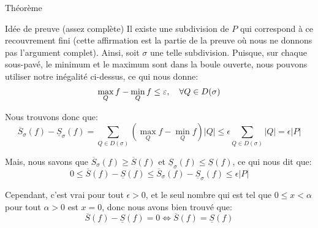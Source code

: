 \documentclass[a4paper]{article}
\begin{document}
\begin{parag}{Théorème}
\begin{subparag}{Idée de preuve (assez complète)}
        Il existe une subdivision de $P$ qui correspond à ce recouvrement fini (cette affirmation est la partie de la preuve où nous ne donnons pas l'argument complet). Ainsi, soit $\sigma$ une telle subdivision. Puisque, sur chaque sous-pavé, le minimum et le maximum sont dans la boule ouverte, nous pouvons utiliser notre inégalité ci-dessus, ce qui nous donne: 
        \[\max_{Q} f - \min_{Q} f \leq \epsilon, \mathspace \forall Q \in D\left(\sigma\right)\]
        
        Nous trouvons donc que: 
        \[\overline{S}_{\sigma}\left(f\right) - \underline{S}_{\sigma}\left(f\right) = \sum_{Q \in D\left(\sigma\right)}^{} \left(\max_{Q} f - \min_{Q} f\right) \left|Q\right| \leq \epsilon \sum_{Q \in D\left(\sigma\right)}^{} \left|Q\right| = \epsilon \left|P\right|\]

        Mais, nous savons que $\overline{S}_{\sigma}\left(f\right) \geq \overline{S}\left(f\right)$ et $\underline{S}_{\sigma}\left(f\right) \leq \underline{S}\left(f\right)$, ce qui nous dit que: 
        \[0 \leq \overline{S}\left(f\right) - \underline{S}\left(f\right) \leq \overline{S}_{\sigma}\left(f\right) - \underline{S}_{\sigma}\left(f\right) \leq \epsilon \left|P\right|\]
        
        Cependant, c'est vrai pour tout $\epsilon > 0$, et le seul nombre qui est tel que $0 \leq x < \alpha$ pour tout $\alpha > 0$ est $x = 0$, donc nous avons bien trouvé que: 
        \[\overline{S}\left(f\right) - \underline{S}\left(f\right) = 0 \iff \overline{S}\left(f\right) = \underline{S}\left(f\right)\]
    \end{subparag}
\end{parag}
\end{document}
